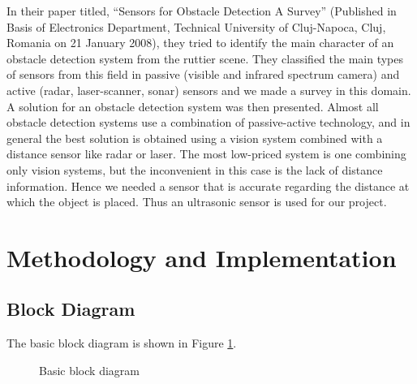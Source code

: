 \documentclass[times, 1pt, a4paper]{article}
\begin{document}
In their paper titled, “Sensors for Obstacle Detection A Survey” (Published in Basis of Electronics Department, Technical University of Cluj-Napoca, Cluj, Romania on 21 January 2008), they tried to identify the main character of an obstacle detection system from the ruttier scene. They classified the main types of sensors from this field in passive (visible and infrared spectrum camera) and active (radar, laser-scanner, sonar) sensors and we made a survey in this domain. A solution for an obstacle detection system was then presented. Almost all obstacle detection systems use a combination of passive-active technology, and in general the best solution is obtained using a vision system combined with a distance sensor like radar or laser. The most low-priced system is one combining only vision systems, but the inconvenient in this case is the lack of distance information. Hence we needed a sensor that is accurate regarding the distance at which the object is placed. Thus an ultrasonic sensor is used for our project.


\section{Methodology and Implementation} \label{section:methodology}

\subsection{Block Diagram} \label{subsection:block_diagram}
 
The basic block diagram is shown in Figure \ref{fig:block_diagram}. 

  \begin{figure}[h] 
	\centering
	\centering
	\caption{Basic block diagram}
	\label{fig:block_diagram}
	\end{figure}
\end{document}
